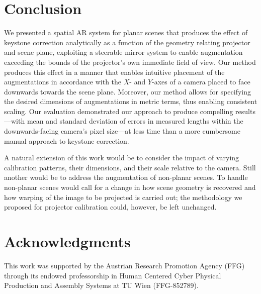 \documentclass[review]{elsarticle}
\begin{document}
\section{Conclusion}

We presented a spatial AR system for planar scenes that produces the effect of keystone correction analytically as a function of the geometry relating projector and scene plane, exploiting a steerable mirror system to enable augmentation exceeding the bounds of the projector's own immediate field of view. Our method produces this effect in a manner that enables intuitive placement of the augmentations in accordance with the $X$- and $Y$-axes of a camera placed to face downwards towards the scene plane. Moreover, our method allows for specifying the desired dimensions of augmentations in metric terms, thus enabling consistent scaling. Our evaluation demonstrated our approach to produce compelling results---with mean and standard deviation of errors in measured lengths within the downwards-facing camera's pixel size---at less time than a more cumbersome manual approach to keystone correction.

A natural extension of this work would be to consider the impact of varying calibration patterns, their dimensions, and their scale relative to the camera. Still another would be to address the augmentation of non-planar scenes. To handle non-planar scenes would call for a change in how scene geometry is recovered and how warping of the image to be projected is carried out; the methodology we proposed for projector calibration could, however, be left unchanged.

\section{Acknowledgments}

This work was supported by the Austrian Research Promotion Agency (FFG) through its endowed professorship in Human Centered Cyber Physical Production and Assembly Systems at TU Wien (FFG-852789).


\end{document}
